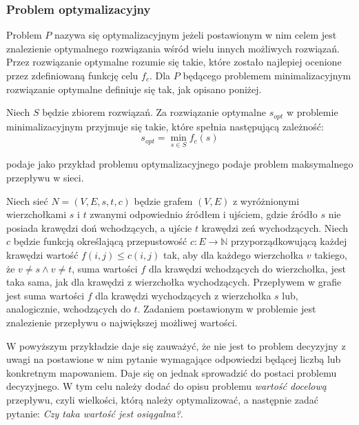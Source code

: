 \subsubsection{Problem optymalizacyjny}

\begin{definition}
Problem $P$ nazywa się optymalizacyjnym jeżeli postawionym w nim celem jest znalezienie optymalnego rozwiązania wśród wielu innych możliwych rozwiązań. Przez rozwiązanie optymalne rozumie się takie, które zostało najlepiej ocenione przez zdefiniowaną funkcję celu $f_{c}$. Dla $P$ będącego problemem minimalizacyjnym rozwiązanie optymalne definiuje się tak, jak opisano poniżej.

Niech $S$ będzie zbiorem rozwiązań. Za rozwiązanie optymalne $s_{opt}$ w problemie minimalizacyjnym przyjmuje się takie, które spełnia następującą zależność:
    \begin{equation}
        s_{opt} = \min_{s \in S} f_{c}(s)
    \end{equation}
\end{definition}
\cite{ZlozonoscObliczeniowa} podaje jako przykład problemu optymalizacyjnego podaje problem maksymalnego przepływu w sieci.

\begin{example}
Niech sieć $N = (V, E, s, t, c)$ będzie grafem $(V, E)$ z wyróżnionymi wierzchołkami $s$ i $t$ zwanymi odpowiednio źródłem i ujściem, gdzie źródło $s$ nie posiada krawędzi doń wchodzących, a ujście $t$ krawędzi zeń wychodzących. Niech $c$ będzie funkcją określającą przepustowość $c: E \to \mathbb{N}$ przyporządkowującą każdej krawędzi wartość $f(i,j) \leq c(i,j)$ tak, aby dla każdego wierzchołka $v$ takiego, że $v \neq s \land v \neq t$, suma wartości $f$ dla krawędzi wchodzących do wierzchołka, jest taka sama, jak dla krawędzi z wierzchołka wychodzących. Przepływem w grafie jest suma wartości $f$ dla krawędzi wychodzących z wierzchołka $s$ lub, analogicznie, wchodzących do $t$. Zadaniem postawionym w problemie jest znalezienie przepływu o największej możliwej wartości.
\end{example}

W powyższym przykładzie daje się zauważyć, że nie jest to problem decyzyjny z uwagi na postawione w nim pytanie wymagające odpowiedzi będącej liczbą lub konkretnym mapowaniem. Daje się on jednak sprowadzić do postaci problemu decyzyjnego. W tym celu należy dodać do opisu problemu \textit{wartość docelową} przepływu, czyli wielkości, którą należy optymalizować, a następnie zadać pytanie: \textit{Czy taka wartość jest osiągalna?}.


